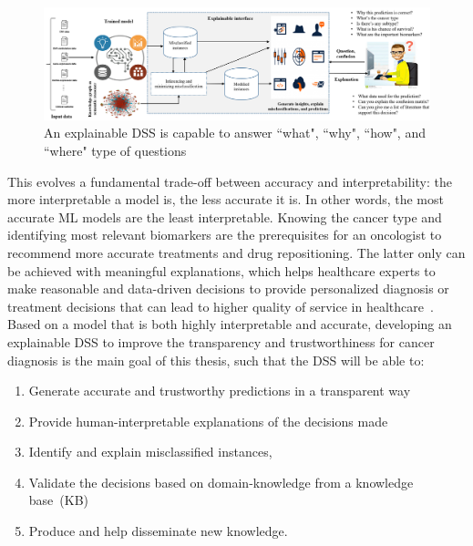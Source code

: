 \begin{figure}
	\centering
	\includegraphics[scale=0.55]{images/xai_interface.png}
	\caption{An explainable DSS is capable to answer ``what", ``why", ``how", and ``where" type of questions}
    \label{fig:model_bbm3}
    \vspace{-2mm}
\end{figure}

\hspace*{3.5mm} This evolves a fundamental trade-off between accuracy and interpretability: the more interpretable a model is, the less accurate it is. In other words, the most accurate ML models are the least interpretable. %
Knowing the cancer type and identifying most relevant biomarkers are the prerequisites for an oncologist to recommend more accurate treatments and drug repositioning. The latter only can be achieved with meaningful explanations, which helps healthcare experts to make reasonable and data-driven decisions to provide personalized diagnosis or treatment decisions that can lead to higher quality of service in healthcare~\cite{stiglic2020interpretability}. Based on a model that is both highly interpretable and accurate, developing an explainable DSS to improve the transparency and trustworthiness for cancer diagnosis is the main goal of this thesis, such that the DSS will be able to: 

\begin{enumerate}[noitemsep]
    \item Generate accurate and trustworthy predictions in a transparent way
    \item Provide human-interpretable explanations of the decisions made
    \item Identify and explain misclassified instances, 
    \item Validate the decisions based on domain-knowledge from a knowledge base~(KB)
    \item Produce and help disseminate new knowledge. 
\end{enumerate}

